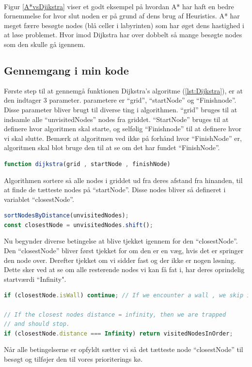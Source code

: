 \documentclass[12pt]{article}
\begin{document}
\\Figur \ref{A*vsDjikstra} viser et godt eksempel på hvordan A* har haft en bedre fornemmelse for hvor slut noden er på grund af dens brug af Heuristics. A* har meget færre besøgte nodes (blå celler i labyrinten) som har øget dens hastighed i at løse problemet. 
Hvor imod Dijkstra har over dobbelt så mange besøgte nodes som den skulle gå igennem. 
\newpage
\subsection{Gennemgang i min kode}
Første step til at gennemgå funktionen Dijkstra’s algoritme (\ref{lst:Dijkstra}), er at den indtager 3 parameter. parametere er “grid”, 
“startNode” og “Finishnode”. Disse parameter bliver brugt til diverse ting i algorithmen.
“grid” bruges til at indsamle alle “unvisitedNodes” nodes fra griddet. 
“StartNode” bruges til at definere hvor algoritmen skal starte, og selfølig “Finishnode” til at definere hvor vi skal slutte. Bemærk at algoritmen ved ikke på forhånd hvor “FinishNode” er, algoritmen skal blot bruge den til at se om det har fundet “FinishNode”.   
\begin{lstlisting}[language=JavaScript]
function dijkstra(grid , startNode , finishNode)
\end{lstlisting}
Algorithmen sortere så alle nodes i griddet ud fra deres afstand fra hinanden, til at finde de tætteste nodes på “startNode”. Disse nodes bliver så defineret i variablet “closestNode”.
\begin{lstlisting}[language=JavaScript]
sortNodesByDistance(unvisitedNodes);
const closestNode = unvisitedNodes.shift();
\end{lstlisting}
Nu begynder diverse betingelse at blive tjekket igennem for den “closestNode”. Den “closestNode” bliver først tjekket for om den er en væg, hvis det er springer den node over. Derefter tjekket om vi sidder fast og der ikke er nogen løsning. Dette sker ved at se om alle resterende nodes vi kan få fat i, har deres oprindelig startværdi “Infinity".
\begin{lstlisting}[language=JavaScript]
if (closestNode.isWall) continue; // If we encounter a wall , we skip it.

// If the closest nodes distance = infinity, then we are trapped
// and should stop.
if (closestNode.distance === Infinity) return visitedNodesInOrder; 
\end{lstlisting}
Når alle betingelserne er opfyldt sætter vi så det tætteste node “closestNode” til besøgt og tilføjer den til vores prioriterings kø. 
\end{document}
